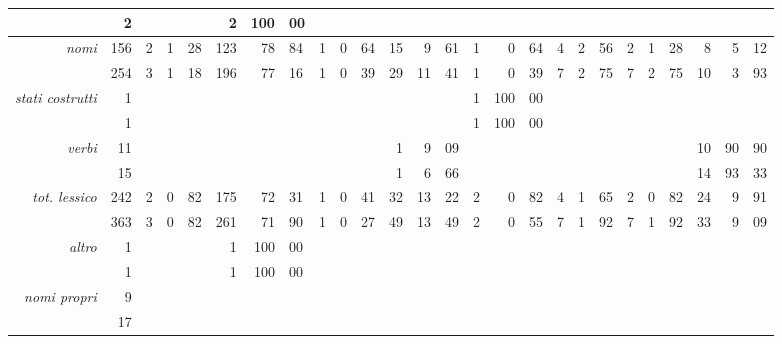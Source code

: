 \begin{table}
{{\begin{tabular}{|>{\it}r|r|*{8}{rr@{.}l@{\% }|}}
 & 2 & \multicolumn{3}{c|}{} & 2&100&00 & \multicolumn{3}{c|}{} & \multicolumn{3}{c|}{} & \multicolumn{3}{c|}{} & \multicolumn{3}{c|}{} & \multicolumn{3}{c|}{} & \multicolumn{3}{c|}{}\\
\hline
nomi & 156 & 2&1&28 & 123&78&84 & 1&0&64 & 15&9&61 & 1&0&64 & 4&2&56 & 2&1&28 & 8&5&12\\
 & 254 & 3&1&18 & 196&77&16 & 1&0&39 & 29&11&41 & 1&0&39 & 7&2&75 & 7&2&75 & 10&3&93\\
\hline
stati costrutti & 1 & \multicolumn{3}{c|}{} & \multicolumn{3}{c|}{} & \multicolumn{3}{c|}{} & \multicolumn{3}{c|}{} & 1&100&00 & \multicolumn{3}{c|}{} & \multicolumn{3}{c|}{} & \multicolumn{3}{c|}{}\\
 & 1 & \multicolumn{3}{c|}{} & \multicolumn{3}{c|}{} & \multicolumn{3}{c|}{} & \multicolumn{3}{c|}{} & 1&100&00 & \multicolumn{3}{c|}{} & \multicolumn{3}{c|}{} & \multicolumn{3}{c|}{}\\
\hline
verbi & 11 & \multicolumn{3}{c|}{} & \multicolumn{3}{c|}{} & \multicolumn{3}{c|}{} & 1&9&09 & \multicolumn{3}{c|}{} & \multicolumn{3}{c|}{} & \multicolumn{3}{c|}{} & 10&90&90\\
 & 15 & \multicolumn{3}{c|}{} & \multicolumn{3}{c|}{} & \multicolumn{3}{c|}{} & 1&6&66 & \multicolumn{3}{c|}{} & \multicolumn{3}{c|}{} & \multicolumn{3}{c|}{} & 14&93&33\\
\hline
\hline
tot. lessico & 242 & 2&0&82 & 175&72&31 & 1&0&41 & 32&13&22 & 2&0&82 & 4&1&65 & 2&0&82 & 24&9&91\\
 & 363 & 3&0&82 & 261&71&90 & 1&0&27 & 49&13&49 & 2&0&55 & 7&1&92 & 7&1&92 & 33&9&09\\
\hline
\hline
altro & 1 & \multicolumn{3}{c|}{} & 1&100&00 & \multicolumn{3}{c|}{} & \multicolumn{3}{c|}{} & \multicolumn{3}{c|}{} & \multicolumn{3}{c|}{} & \multicolumn{3}{c|}{} & \multicolumn{3}{c|}{}\\
 & 1 & \multicolumn{3}{c|}{} & 1&100&00 & \multicolumn{3}{c|}{} & \multicolumn{3}{c|}{} & \multicolumn{3}{c|}{} & \multicolumn{3}{c|}{} & \multicolumn{3}{c|}{} & \multicolumn{3}{c|}{}\\
\hline
nomi propri & 9 & \multicolumn{3}{c|}{} & \multicolumn{3}{c|}{} & \multicolumn{3}{c|}{} & \multicolumn{3}{c|}{} & \multicolumn{3}{c|}{} & \multicolumn{3}{c|}{} & \multicolumn{3}{c|}{} & \multicolumn{3}{c|}{}\\
 & 17 & \multicolumn{3}{c|}{} & \multicolumn{3}{c|}{} & \multicolumn{3}{c|}{} & \multicolumn{3}{c|}{} & \multicolumn{3}{c|}{} & \multicolumn{3}{c|}{} & \multicolumn{3}{c|}{} & \multicolumn{3}{c|}{}\\

\end{tabular}}}
\end{table}
